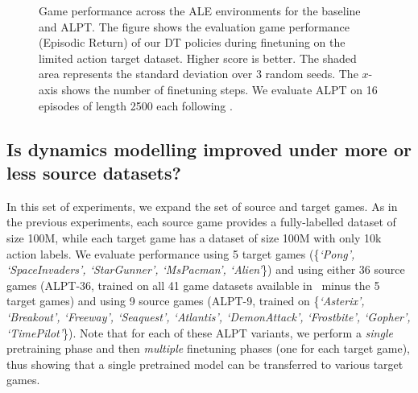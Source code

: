 \documentclass{article} %
\begin{document}
\begin{figure}[]
\caption{Game performance across the ALE environments for the baseline and ALPT.  The figure shows the evaluation game performance (Episodic Return) of our DT policies during finetuning on the limited action target dataset.  Higher score is better.  The shaded area represents the standard deviation over $3$ random seeds.  The $x$-axis shows the number of finetuning steps. We evaluate ALPT on 16 episodes of length 2500 each following \citep{https://doi.org/10.48550/arxiv.2205.15241}.}
\label{aleres}
\end{figure}

\subsection{Is dynamics modelling improved under more or less source datasets?}

In this set of experiments, we expand the set of source and target games.  As in the previous experiments, each source game provides a fully-labelled dataset of size 100M, while each target game has a dataset of size 100M with only 10k action labels. We evaluate performance using 5 target games (\{\textit{`Pong', `SpaceInvaders', `StarGunner', `MsPacman', `Alien'}\}) and using either 36 source games (ALPT-36, trained on all 41 game datasets available in~\citet{agarwal2020optimistic} minus the 5 target games) and using 9 source games (ALPT-9, trained on \{\textit{`Asterix', `Breakout', `Freeway', `Seaquest', `Atlantis', `DemonAttack', `Frostbite', `Gopher', `TimePilot'}\}). 
Note that for each of these ALPT variants, we perform a \emph{single} pretraining phase and then \emph{multiple} finetuning phases (one for each target game), thus showing that a single pretrained model can be transferred to various target games.
\end{document}
